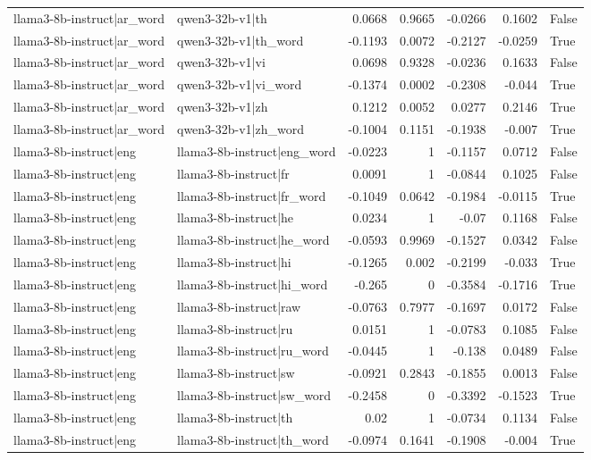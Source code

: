 \begin{table}
\begin{tabular}{l l r r r r l}
llama3-8b-instruct|ar_word & qwen3-32b-v1|th & 0.0668 & 0.9665 & -0.0266 & 0.1602 & False \\
llama3-8b-instruct|ar_word & qwen3-32b-v1|th_word & -0.1193 & 0.0072 & -0.2127 & -0.0259 & True \\
llama3-8b-instruct|ar_word & qwen3-32b-v1|vi & 0.0698 & 0.9328 & -0.0236 & 0.1633 & False \\
llama3-8b-instruct|ar_word & qwen3-32b-v1|vi_word & -0.1374 & 0.0002 & -0.2308 & -0.044 & True \\
llama3-8b-instruct|ar_word & qwen3-32b-v1|zh & 0.1212 & 0.0052 & 0.0277 & 0.2146 & True \\
llama3-8b-instruct|ar_word & qwen3-32b-v1|zh_word & -0.1004 & 0.1151 & -0.1938 & -0.007 & True \\
llama3-8b-instruct|eng & llama3-8b-instruct|eng_word & -0.0223 & 1 & -0.1157 & 0.0712 & False \\
llama3-8b-instruct|eng & llama3-8b-instruct|fr & 0.0091 & 1 & -0.0844 & 0.1025 & False \\
llama3-8b-instruct|eng & llama3-8b-instruct|fr_word & -0.1049 & 0.0642 & -0.1984 & -0.0115 & True \\
llama3-8b-instruct|eng & llama3-8b-instruct|he & 0.0234 & 1 & -0.07 & 0.1168 & False \\
llama3-8b-instruct|eng & llama3-8b-instruct|he_word & -0.0593 & 0.9969 & -0.1527 & 0.0342 & False \\
llama3-8b-instruct|eng & llama3-8b-instruct|hi & -0.1265 & 0.002 & -0.2199 & -0.033 & True \\
llama3-8b-instruct|eng & llama3-8b-instruct|hi_word & -0.265 & 0 & -0.3584 & -0.1716 & True \\
llama3-8b-instruct|eng & llama3-8b-instruct|raw & -0.0763 & 0.7977 & -0.1697 & 0.0172 & False \\
llama3-8b-instruct|eng & llama3-8b-instruct|ru & 0.0151 & 1 & -0.0783 & 0.1085 & False \\
llama3-8b-instruct|eng & llama3-8b-instruct|ru_word & -0.0445 & 1 & -0.138 & 0.0489 & False \\
llama3-8b-instruct|eng & llama3-8b-instruct|sw & -0.0921 & 0.2843 & -0.1855 & 0.0013 & False \\
llama3-8b-instruct|eng & llama3-8b-instruct|sw_word & -0.2458 & 0 & -0.3392 & -0.1523 & True \\
llama3-8b-instruct|eng & llama3-8b-instruct|th & 0.02 & 1 & -0.0734 & 0.1134 & False \\
llama3-8b-instruct|eng & llama3-8b-instruct|th_word & -0.0974 & 0.1641 & -0.1908 & -0.004 & True \\

\end{tabular}
\end{table}
